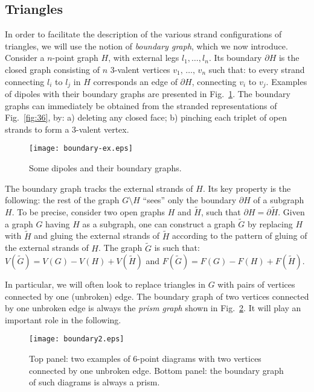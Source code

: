 \documentclass[10pt]{article}
\theoremstyle{plain}
\theoremstyle{definition}
\begin{document}
 \newpage
 
 \subsection{Triangles}\label{sec:triangles}
 
In order to facilitate the description of the various strand configurations of triangles, we will use 
the notion of \emph{boundary graph}, which we now introduce. Consider a $n$-point graph $H$, with external legs $l_1 , \ldots , l_n$. Its boundary 
$\partial H$ is the closed graph consisting of $n$ $3$-valent vertices $v_1, \,\ldots,\, v_n$ such that: to every strand connecting $l_i$ to $l_j$ in $H$ corresponds an edge 
of $\partial H$, connecting $v_i$ to $v_j$. Examples of dipoles with their boundary graphs are presented in Fig.~\ref{fig:boundary-ex}. The boundary graphs 
can immediately be obtained from the stranded representations of Fig.~\ref{fig:36}, by: a) deleting any closed face; b) pinching each triplet of open strands to form a $3$-valent vertex. 
\begin{figure}[htb]
 \begin{center}
 \texttt{[image: boundary-ex.eps]}  
 \caption{Some dipoles and their boundary graphs.} \label{fig:boundary-ex}
 \end{center}
 \end{figure}
 
The boundary graph tracks the external strands of $H$. Its key property is the following: the rest of the graph $G\setminus H$ ``sees'' only the boundary $\partial H$ of a subgraph $H$.
To be precise, consider two open graphs $H$ and $\tilde{H}$, such that $\partial H = \partial \tilde{H}$. Given a graph $G$ having $H$ as a subgraph, 
one can construct a graph $\tilde{G}$ by replacing $H$ with $\tilde{H}$ and gluing the external strands of $\tilde H$ according to the 
pattern of gluing of the external strands of $H$. 
The graph $\tilde G$ is such that: $V(\tilde{G}) =  V(G) - V(H) + V(\tilde{H})$ and $F(\tilde{G}) =  F(G) - F(H) + F(\tilde{H})$.  


In particular, we will often look to replace triangles in $G$ with pairs of vertices connected by one (unbroken) edge. The boundary graph of 
two vertices connected by one unbroken edge is always the \emph{prism graph} shown in Fig.~\ref{fig:boundary2}. It will play an important role in the following.
\begin{figure}[htb]
 \begin{center}
 \texttt{[image: boundary2.eps]}  
 \caption{Top panel: two examples of $6$-point diagrams with two vertices connected by one unbroken edge. Bottom panel: the boundary graph of such diagrams is always a prism.} \label{fig:boundary2}
 \end{center}
 \end{figure}
\end{document}
